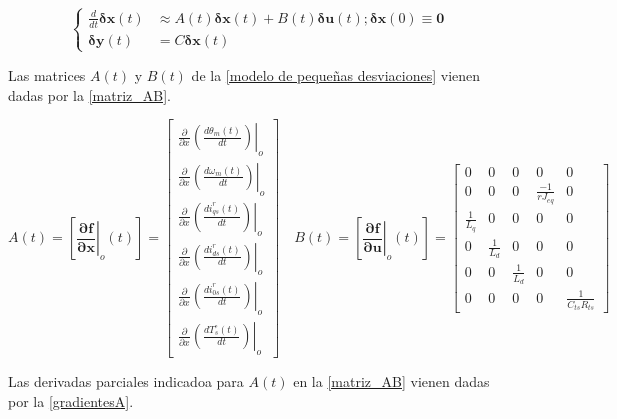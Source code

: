 \documentclass[a4paper, 10pt, onecolumn,journal]{ieeeconf}
\begin{document}
\begin{equation}
    \begin{cases}
        \frac{d}{dt} \mathbf{\delta x}(t) &\approx A(t) \mathbf{\delta x}(t) + B(t) \mathbf{\delta u}(t); \mathbf{\delta x}(0) \equiv \mathbf{0}\\
        \mathbf{\delta y}(t) &= C\mathbf{\delta x}(t)
    \end{cases}
    \label{modelo de pequeñas desviaciones}
\end{equation}

Las matrices $A(t)$ y $B(t)$ de la \cref{modelo de pequeñas desviaciones} vienen dadas por la \cref{matriz_AB}.

\begin{equation}
    A(t) = \left[ \left. \frac{\mathbf{\partial f}}{\mathbf{\partial x}} \right|_{o}(t) \right] =
    \begin{bmatrix}
        \left.\frac{\partial}{\partial x}\left( \frac{d \theta_m(t)}{dt}\right)\right|_{o} \\ 
        \left.\frac{\partial}{\partial x}\left( \frac{d \omega_m(t)}{dt}\right)\right|_{o} \\
        \left.\frac{\partial}{\partial x}\left( \frac{d i^r_{qs}(t)}{dt}\right)\right|_{o} \\ 
        \left.\frac{\partial}{\partial x}\left( \frac{d i^r_{ds}(t)}{dt}\right)\right|_{o} \\ 
        \left.\frac{\partial}{\partial x}\left( \frac{d i^r_{0s}(t)}{dt}\right)\right|_{o} \\ 
        \left.\frac{\partial}{\partial x}\left( \frac{d T^\circ_s(t)}{dt}\right)\right|_{o} 
    \end{bmatrix}\quad
    B(t) = \left[ \left. \frac{\mathbf{\partial f}}{\mathbf{\partial u}} \right|_{o}(t) \right] =
    \begin{bmatrix}
        0 & 0 & 0 & 0 & 0\\
        0 & 0 & 0 & \frac{-1}{r J_{eq}} & 0\\
        \frac{1}{L_q} & 0 & 0 & 0 & 0\\
        0 & \frac{1}{L_d} & 0 & 0 & 0\\
        0 & 0 & \frac{1}{L_d} & 0 & 0\\
        0 & 0 & 0 & 0 & \frac{1}{C_{ts} R_{ts}}
    \end{bmatrix}
    \label{matriz_AB}
\end{equation}

Las derivadas parciales indicadoa para $A(t)$ en la \cref{matriz_AB} vienen dadas por la \cref{gradientesA}.
\end{document}
